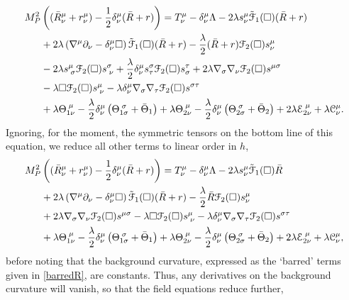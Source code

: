 \[ \begin{aligned}M_{P}^{2}&\left((\bar{R}_{\nu}^{\mu}+r_{\nu}^{\mu})-\frac{1}{2}\delta_{\nu}^{\mu}(\bar{R}+r)\right)  =T_{\nu}^{\mu}-\delta_{\nu}^{\mu}\Lambda-2\lambda s_{\nu}^{\mu}{\cal \tilde{F}}_{1}(\Box)(\bar{R}+r)\\
 & +2\lambda\left(\nabla^{\mu}\partial_{\nu}-\delta_{\nu}^{\mu}\square\right)\tilde{{\cal F}}_{1}(\Box)(\bar{R}+r)-\frac{\lambda}{2}(\bar{R}+r){\cal F}_{2}(\Box)s_{\nu}^{\mu}\\
 & -2\lambda s_{\;\sigma}^{\mu}{\cal F}_{2}(\Box)s_{\;\nu}^{\sigma}+\frac{\lambda}{2}\delta_{\nu}^{\mu}s_{\tau}^{\sigma}{\cal F}_{2}(\Box)s_{\sigma}^{\tau}+2\lambda\nabla_{\sigma}\nabla_{\nu}{\cal F}_{2}(\Box)s^{\mu\sigma}\\
 & -\lambda\square{\cal F}_{2}(\Box)s_{\;\nu}^{\mu}-\lambda\delta_{\nu}^{\mu}\nabla_{\sigma}\nabla_{\tau}{\cal F}_{2}(\Box)s^{\sigma\tau}\\
 & +\lambda\Theta_{1\nu}^{\;\mu}-\frac{\lambda}{2}\delta_{\nu}^{\mu}\left(\Theta_{1\sigma}^{\;\sigma}+\bar{\Theta}_{1}\right)+\lambda\Theta_{2\nu}^{\;\mu}-\frac{\lambda}{2}\delta_{\nu}^{\mu}\left(\Theta_{2\sigma}^{\;\sigma}+\bar{\Theta}_{2}\right)+2\lambda{\cal E}_{2\nu}^{\;\mu}+\lambda{\cal C}_{\nu}^{\mu}.
\end{aligned}
\]
Ignoring, for the moment, the symmetric tensors on the bottom line of this equation, we reduce all other terms to linear order in $h$,
\[
\begin{aligned}M_{P}^{2}&\left((\bar{R}_{\nu}^{\mu}+r_{\nu}^{\mu})-\frac{1}{2}\delta_{\nu}^{\mu}(\bar{R}+r)\right) =T_{\nu}^{\mu}-\delta_{\nu}^{\mu}\Lambda-2\lambda s_{\nu}^{\mu}{\cal \tilde{F}}_{1}(\Box)\bar{R}\\
 & +2\lambda\left(\nabla^{\mu}\partial_{\nu}-\delta_{\nu}^{\mu}\square\right)\tilde{{\cal F}}_{1}(\Box)(\bar{R}+r)-\frac{\lambda}{2}\bar{R}{\cal F}_{2}(\Box)s_{\nu}^{\mu}\\
 & +2\lambda\nabla_{\sigma}\nabla_{\nu}{\cal F}_{2}(\Box)s^{\mu\sigma}-\lambda\square{\cal F}_{2}(\Box)s_{\;\nu}^{\mu}-\lambda\delta_{\nu}^{\mu}\nabla_{\sigma}\nabla_{\tau}{\cal F}_{2}(\Box)s^{\sigma\tau}\\
 & +\lambda\Theta_{1\nu}^{\;\mu}-\frac{\lambda}{2}\delta_{\nu}^{\mu}\left(\Theta_{1\sigma}^{\;\sigma}+\bar{\Theta}_{1}\right)+\lambda\Theta_{2\nu}^{\;\mu}-\frac{\lambda}{2}\delta_{\nu}^{\mu}\left(\Theta_{2\sigma}^{\;\sigma}+\bar{\Theta}_{2}\right)+2\lambda{\cal E}_{2\nu}^{\;\mu}+\lambda{\cal C}_{\nu}^{\mu},
\end{aligned}
\] 
before noting that the background curvature, expressed as the `barred' terms given in \eqref{barredR}, are constants. Thus, any derivatives on the background curvature will vanish, so that the field equations reduce further,
